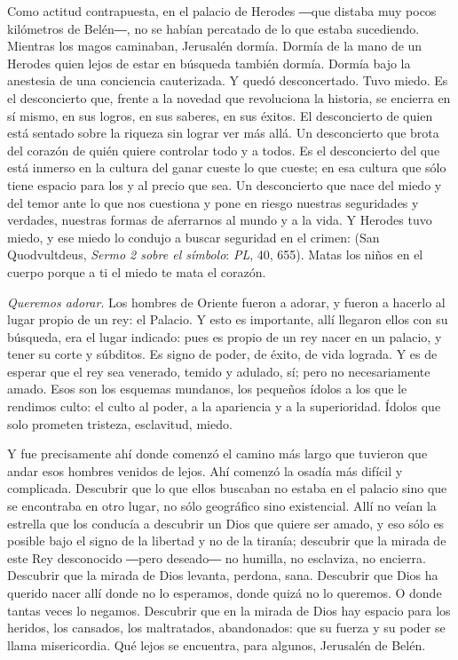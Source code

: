 \begin{body}
\begin{body}
{Como actitud contrapuesta, en el palacio de Herodes ―que distaba muy pocos kilómetros de Belén―, no se habían percatado de lo que estaba sucediendo. Mientras los magos caminaban, Jerusalén dormía. Dormía de la mano de un Herodes quien lejos de estar en búsqueda también dormía. Dormía bajo la anestesia de una conciencia cauterizada. Y quedó desconcertado. Tuvo miedo. Es el desconcierto que, frente a la novedad que revoluciona la historia, se encierra en sí mismo, en sus logros, en sus saberes, en sus éxitos. El desconcierto de quien está sentado sobre la riqueza sin lograr ver más allá. Un desconcierto que brota del corazón de quién quiere controlar todo y a todos. Es el desconcierto del que está inmerso en la cultura del ganar cueste lo que cueste; en esa cultura que sólo tiene espacio para los  y al precio que sea. Un desconcierto que nace del miedo y del temor ante lo que nos cuestiona y pone en riesgo nuestras seguridades y verdades, nuestras formas de aferrarnos al mundo y a la vida. Y Herodes tuvo miedo, y ese miedo lo condujo a buscar seguridad en el crimen:  (San Quodvultdeus, \emph{Sermo 2 sobre el símbolo}: \emph{PL}, 40, 655). Matas los niños en el cuerpo porque a ti el miedo te mata el corazón.

\emph{Queremos adorar}. Los hombres de Oriente fueron a adorar, y fueron a hacerlo al lugar propio de un rey: el Palacio. Y esto es importante, allí llegaron ellos con su búsqueda, era el lugar indicado: pues es propio de un rey nacer en un palacio, y tener su corte y súbditos. Es signo de poder, de éxito, de vida lograda. Y es de esperar que el rey sea venerado, temido y adulado, sí; pero no necesariamente amado. Esos son los esquemas mundanos, los pequeños ídolos a los que le rendimos culto: el culto al poder, a la apariencia y a la superioridad. Ídolos que solo prometen tristeza, esclavitud, miedo.

Y fue precisamente ahí donde comenzó el camino más largo que tuvieron que andar esos hombres venidos de lejos. Ahí comenzó la osadía más difícil y complicada. Descubrir que lo que ellos buscaban no estaba en el palacio sino que se encontraba en otro lugar, no sólo geográfico sino existencial. Allí no veían la estrella que los conducía a descubrir un Dios que quiere ser amado, y eso sólo es posible bajo el signo de la libertad y no de la tiranía; descubrir que la mirada de este Rey desconocido ―pero deseado― no humilla, no esclaviza, no encierra. Descubrir que la mirada de Dios levanta, perdona, sana. Descubrir que Dios ha querido nacer allí donde no lo esperamos, donde quizá no lo queremos. O donde tantas veces lo negamos. Descubrir que en la mirada de Dios hay espacio para los heridos, los cansados, los maltratados, abandonados: que su fuerza y su poder se llama misericordia. Qué lejos se encuentra, para algunos, Jerusalén de Belén.

}
\end{body}
\end{body}
